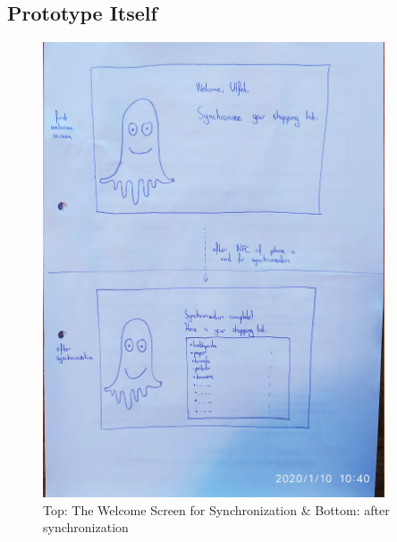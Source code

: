 \clearpage
\subsection{Prototype Itself}

\begin{figure}[H]
	\centering
	\includegraphics[trim={0em 50em 30em 0em}, clip, width=0.90\textwidth]{images/s1/p1.jpg}
	\caption{Top: The Welcome Screen for Synchronization \& Bottom: after synchronization}
	\label{s1:synch}
\end{figure}

